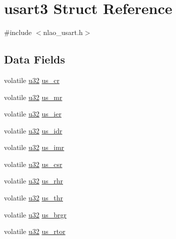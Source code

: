 \hypertarget{structusart3}{
\section{usart3 \-Struct \-Reference}
\label{structusart3}
}


{\ttfamily \#include $<$nlao\-\_\-usart.\-h$>$}

\subsection*{\-Data \-Fields}
\begin{DoxyCompactItemize}
\item 
volatile \hyperlink{nlao__io_8h_a10e94b422ef0c20dcdec20d31a1f5049}{u32} \hyperlink{structusart3_a27990eb6d3270774b95121ca540be470}{us\-\_\-cr}
\item 
volatile \hyperlink{nlao__io_8h_a10e94b422ef0c20dcdec20d31a1f5049}{u32} \hyperlink{structusart3_a8d868ffab428672314805b0e840322d6}{us\-\_\-mr}
\item 
volatile \hyperlink{nlao__io_8h_a10e94b422ef0c20dcdec20d31a1f5049}{u32} \hyperlink{structusart3_ad78f3441f3caf897e4d79cb06790eb43}{us\-\_\-ier}
\item 
volatile \hyperlink{nlao__io_8h_a10e94b422ef0c20dcdec20d31a1f5049}{u32} \hyperlink{structusart3_a3bd04fa21951603375f87079a38bdc49}{us\-\_\-idr}
\item 
volatile \hyperlink{nlao__io_8h_a10e94b422ef0c20dcdec20d31a1f5049}{u32} \hyperlink{structusart3_ac0e6b4f8e7c9200b788f0ff86160592d}{us\-\_\-imr}
\item 
volatile \hyperlink{nlao__io_8h_a10e94b422ef0c20dcdec20d31a1f5049}{u32} \hyperlink{structusart3_a456baf29fc049c455326dc62a8ae5f23}{us\-\_\-csr}
\item 
volatile \hyperlink{nlao__io_8h_a10e94b422ef0c20dcdec20d31a1f5049}{u32} \hyperlink{structusart3_a8e4195718c8440c67bff3ae34660d8f1}{us\-\_\-rhr}
\item 
volatile \hyperlink{nlao__io_8h_a10e94b422ef0c20dcdec20d31a1f5049}{u32} \hyperlink{structusart3_ae16d91cac7892c6780881bd6e347204f}{us\-\_\-thr}
\item 
volatile \hyperlink{nlao__io_8h_a10e94b422ef0c20dcdec20d31a1f5049}{u32} \hyperlink{structusart3_ab164b9ba4892333d651603c9646f24e6}{us\-\_\-brgr}
\item 
volatile \hyperlink{nlao__io_8h_a10e94b422ef0c20dcdec20d31a1f5049}{u32} \hyperlink{structusart3_a018e775f13ee0a5c230dcce9d3b46752}{us\-\_\-rtor}
\item 

\end{DoxyCompactItemize}
